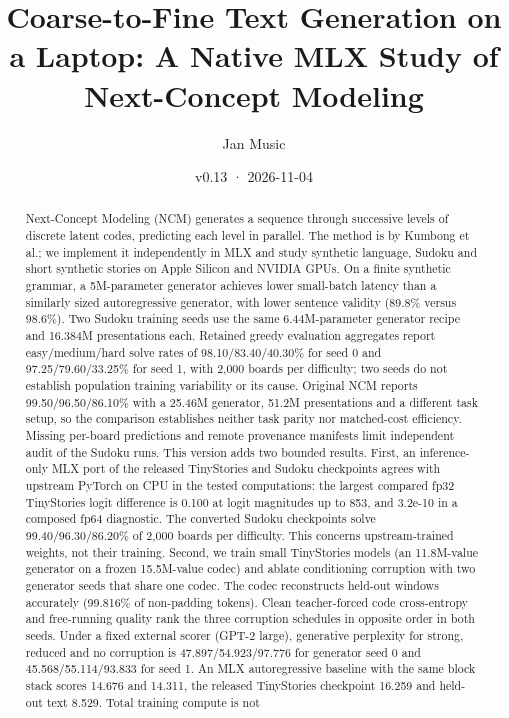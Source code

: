 \documentclass[
  british,
]{article}
\title{Coarse-to-Fine Text Generation on a Laptop: A Native MLX Study of
Next-Concept Modeling}
\author{Jan Music}
\date{v0.13 · 2026-11-04}
\begin{document}
\maketitle
\begin{abstract}
Next-Concept Modeling (NCM) generates a sequence through successive
levels of discrete latent codes, predicting each level in parallel. The
method is by Kumbong et al.; we implement it independently in MLX and
study synthetic language, Sudoku and short synthetic stories on Apple
Silicon and NVIDIA GPUs. On a finite synthetic grammar, a 5M-parameter
generator achieves lower small-batch latency than a similarly sized
autoregressive generator, with lower sentence validity (89.8\% versus
98.6\%). Two Sudoku training seeds use the same 6.44M-parameter
generator recipe and 16.384M presentations each. Retained greedy
evaluation aggregates report easy/medium/hard solve rates of
98.10/83.40/40.30\% for seed 0 and 97.25/79.60/33.25\% for seed 1, with
2,000 boards per difficulty; two seeds do not establish population
training variability or its cause. Original NCM reports
99.50/96.50/86.10\% with a 25.46M generator, 51.2M presentations and a
different task setup, so the comparison establishes neither task parity
nor matched-cost efficiency. Missing per-board predictions and remote
provenance manifests limit independent audit of the Sudoku runs. This
version adds two bounded results. First, an inference-only MLX port of
the released TinyStories and Sudoku checkpoints agrees with upstream
PyTorch on CPU in the tested computations: the largest compared fp32
TinyStories logit difference is 0.100 at logit magnitudes up to 853, and
3.2e-10 in a composed fp64 diagnostic. The converted Sudoku checkpoints
solve 99.40/96.30/86.20\% of 2,000 boards per difficulty. This concerns
upstream-trained weights, not their training. Second, we train small
TinyStories models (an 11.8M-value generator on a frozen 15.5M-value
codec) and ablate conditioning corruption with two generator seeds that
share one codec. The codec reconstructs held-out windows accurately
(99.816\% of non-padding tokens). Clean teacher-forced code
cross-entropy and free-running quality rank the three corruption
schedules in opposite order in both seeds. Under a fixed external scorer
(GPT-2 large), generative perplexity for strong, reduced and no
corruption is 47.897/54.923/97.776 for generator seed 0 and
45.568/55.114/93.833 for seed 1. An MLX autoregressive baseline with the
same block stack scores 14.676 and 14.311, the released TinyStories
checkpoint 16.259 and held-out text 8.529. Total training compute is not

\end{abstract}
\end{document}

